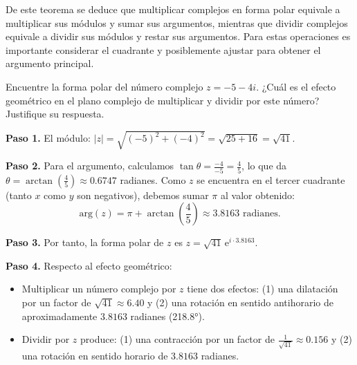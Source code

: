 \begin{rem} 
De este teorema se deduce que multiplicar complejos en forma polar equivale a multiplicar sus módulos y sumar sus argumentos, mientras que dividir complejos equivale a dividir sus módulos y restar sus argumentos. Para estas operaciones es importante considerar el cuadrante y posiblemente ajustar para obtener el argumento principal.
\end{rem}

\begin{example} Encuentre la forma polar del número complejo $z=-5-4i.$ ¿Cuál es el efecto geométrico en el plano complejo de multiplicar y dividir por este número? Justifique su respuesta. \label{formapolar54i}

\begin{myproof}
\textbf{Paso 1.} El módulo: $|z|=\sqrt{(-5)^2+(-4)^2}=\sqrt{25+16}=\sqrt{41}$.

\textbf{Paso 2.} Para el argumento, calculamos $\tan\theta = \frac{-4}{-5}=\frac{4}{5}$, lo que da $\theta = \arctan\left(\frac{4}{5}\right) \approx 0.6747$ radianes. Como $z$ se encuentra en el tercer cuadrante (tanto $x$ como $y$ son negativos), debemos sumar $\pi$ al valor obtenido:
$$\text{arg}(z) = \pi+\arctan\left(\frac{4}{5}\right) \approx 3.8163 \text{ radianes}.$$

\textbf{Paso 3.} Por tanto, la forma polar de $z$ es $\boxed{z=\sqrt{41}\,\mathrm{e}^{i\cdot 3.8163}}$.

\textbf{Paso 4.} Respecto al efecto geométrico:
\begin{itemize}
\item Multiplicar un número complejo por $z$ tiene dos efectos: (1) una dilatación por un factor de $\sqrt{41} \approx 6.40$ y (2) una rotación en sentido antihorario de aproximadamente $3.8163$ radianes (218.8°).
\item Dividir por $z$ produce: (1) una contracción por un factor de $\frac{1}{\sqrt{41}} \approx 0.156$ y (2) una rotación en sentido horario de $3.8163$ radianes.
\end{itemize}
\end{myproof}
\end{example}





